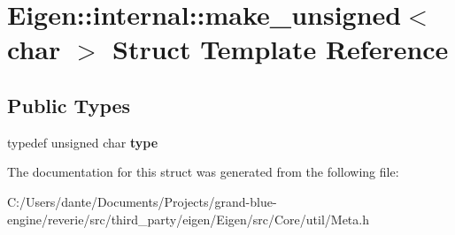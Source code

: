 \hypertarget{struct_eigen_1_1internal_1_1make__unsigned_3_01char_01_4}{}\section{Eigen\+::internal\+::make\+\_\+unsigned$<$ char $>$ Struct Template Reference}
\label{struct_eigen_1_1internal_1_1make__unsigned_3_01char_01_4}
\subsection*{Public Types}
\begin{DoxyCompactItemize}
\item 
\mbox{\label{struct_eigen_1_1internal_1_1make__unsigned_3_01char_01_4_a1d12d0b1780919992cb1ba8dabca0ef4}} 
typedef unsigned char {\bfseries type}
\end{DoxyCompactItemize}


The documentation for this struct was generated from the following file\+:\begin{DoxyCompactItemize}
\item 
C\+:/\+Users/dante/\+Documents/\+Projects/grand-\/blue-\/engine/reverie/src/third\+\_\+party/eigen/\+Eigen/src/\+Core/util/Meta.\+h\end{DoxyCompactItemize}
